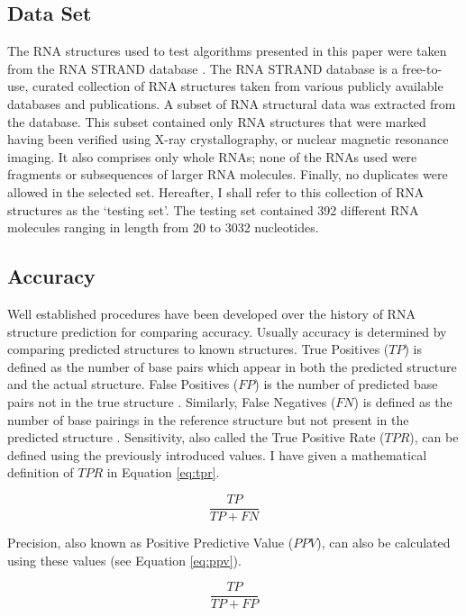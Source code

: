 \documentclass[12pt, a4paper]{article}
\begin{document}
\subsection{Data Set}
The RNA structures used to test algorithms presented in this paper were taken from the RNA STRAND database \cite{andronescu2008rna}. The RNA STRAND database is a free-to-use, curated collection of RNA structures taken from various publicly available databases and publications. A subset of RNA structural data was extracted from the database. This subset contained only RNA structures that were marked having been verified using X-ray crystallography, or nuclear magnetic resonance imaging. It also comprises only whole RNAs; none of the RNAs used were fragments or subsequences of larger RNA molecules. Finally, no duplicates were allowed in the selected set. Hereafter, I shall refer to this collection of RNA structures as the `testing set'. The testing set contained 392 different RNA molecules ranging in length from 20 to 3032 nucleotides.

\subsection{Accuracy}
Well established procedures have been developed over
the history of RNA structure prediction for comparing accuracy. Usually accuracy is determined by comparing predicted structures to known
structures. True Positives ($TP$) is defined as the number of base pairs which appear in both the predicted structure and the actual structure. False Positives
($FP$) is the number of predicted base pairs not in the true
structure \cite{lorenz2011viennarna}. Similarly, False Negatives ($FN$) is defined as the number of base
pairings in the reference structure but not present in the predicted structure \cite{lorenz2011viennarna}.
Sensitivity, also called the True Positive Rate ($TPR$), can be defined using the previously introduced values. I have given a mathematical definition of $TPR$ in Equation \ref{eq:tpr}.

\begin{equation} \label{eq:tpr}
 \frac{TP}{TP + FN}
\end{equation}

Precision, also known as Positive Predictive Value ($PPV$), can also be calculated
using these values (see Equation \ref{eq:ppv}).


\begin{equation} \label{eq:ppv}
 \frac{TP}{TP + FP}
\end{equation}
\end{document}
